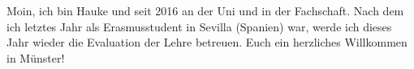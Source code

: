 \begin{multicols*}{2}
{Moin, ich bin Hauke und seit 2016 an der Uni und in der Fachschaft. Nach dem ich letztes Jahr als Erasmusstudent in Sevilla (Spanien) war, werde ich dieses Jahr wieder die Evaluation der Lehre betreuen. Euch ein herzliches Willkommen in Münster! 
	\vspace{2\baselineskip}
}


\end{multicols*}
